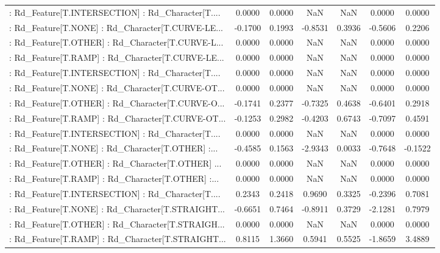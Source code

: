 \begin{longtable}{p{4cm}cccccc}
 : Rd\_Feature[T.INTERSECTION] : Rd\_Character[T.... &  0.0000 &    0.0000 &     NaN &          NaN &  0.0000 &  0.0000 \\
 : Rd\_Feature[T.NONE] : Rd\_Character[T.CURVE-LE... & -0.1700 &    0.1993 & -0.8531 &       0.3936 & -0.5606 &  0.2206 \\
 : Rd\_Feature[T.OTHER] : Rd\_Character[T.CURVE-L... &  0.0000 &    0.0000 &     NaN &          NaN &  0.0000 &  0.0000 \\
 : Rd\_Feature[T.RAMP] : Rd\_Character[T.CURVE-LE... &  0.0000 &    0.0000 &     NaN &          NaN &  0.0000 &  0.0000 \\
 : Rd\_Feature[T.INTERSECTION] : Rd\_Character[T.... &  0.0000 &    0.0000 &     NaN &          NaN &  0.0000 &  0.0000 \\
 : Rd\_Feature[T.NONE] : Rd\_Character[T.CURVE-OT... &  0.0000 &    0.0000 &     NaN &          NaN &  0.0000 &  0.0000 \\
 : Rd\_Feature[T.OTHER] : Rd\_Character[T.CURVE-O... & -0.1741 &    0.2377 & -0.7325 &       0.4638 & -0.6401 &  0.2918 \\
 : Rd\_Feature[T.RAMP] : Rd\_Character[T.CURVE-OT... & -0.1253 &    0.2982 & -0.4203 &       0.6743 & -0.7097 &  0.4591 \\
 : Rd\_Feature[T.INTERSECTION] : Rd\_Character[T.... &  0.0000 &    0.0000 &     NaN &          NaN &  0.0000 &  0.0000 \\
 : Rd\_Feature[T.NONE] : Rd\_Character[T.OTHER] :... & -0.4585 &    0.1563 & -2.9343 &       0.0033 & -0.7648 & -0.1522 \\
 : Rd\_Feature[T.OTHER] : Rd\_Character[T.OTHER] ... &  0.0000 &    0.0000 &     NaN &          NaN &  0.0000 &  0.0000 \\
 : Rd\_Feature[T.RAMP] : Rd\_Character[T.OTHER] :... &  0.0000 &    0.0000 &     NaN &          NaN &  0.0000 &  0.0000 \\
 : Rd\_Feature[T.INTERSECTION] : Rd\_Character[T.... &  0.2343 &    0.2418 &  0.9690 &       0.3325 & -0.2396 &  0.7081 \\
 : Rd\_Feature[T.NONE] : Rd\_Character[T.STRAIGHT... & -0.6651 &    0.7464 & -0.8911 &       0.3729 & -2.1281 &  0.7979 \\
 : Rd\_Feature[T.OTHER] : Rd\_Character[T.STRAIGH... &  0.0000 &    0.0000 &     NaN &          NaN &  0.0000 &  0.0000 \\
 : Rd\_Feature[T.RAMP] : Rd\_Character[T.STRAIGHT... &  0.8115 &    1.3660 &  0.5941 &       0.5525 & -1.8659 &  3.4889 \\

\end{longtable}
